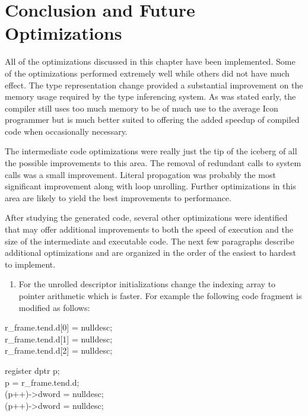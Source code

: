 \section{Conclusion and Future Optimizations}

All of the optimizations discussed in this chapter have been
implemented. Some of the optimizations performed extremely well while
others did not have much effect. The type representation change
provided a substantial improvement on the memory usage required by the
type inferencing system. As was stated early, the compiler still uses
too much memory to be of much use to the average Icon programmer but
is much better suited to offering the added speedup of compiled code
when occasionally necessary.

The intermediate code optimizations were really just the tip of the
iceberg of all the possible improvements to this area. The removal of
redundant calls to system calls was a small improvement. Literal
propagation was probably the most significant improvement along with
loop unrolling. Further optimizations in this area are likely to yield
the best improvements to performance.

After studying the generated code, several other optimizations were
identified that may offer additional improvements to both the speed of
execution and the size of the intermediate and executable code. The
next few paragraphs describe additional optimizations and are
organized in the order of the easiest to hardest to implement.

\liststyleLxxxvi
\begin{enumerate}
\item 
For the unrolled descriptor initializations change the indexing array to pointer arithmetic which is faster. For example
the following code fragment is modified as follows: 
\end{enumerate}
\goodbreak
\begin{iconcode}
r\_frame.tend.d[0] = nulldesc;\\
r\_frame.tend.d[1] = nulldesc;\\
r\_frame.tend.d[2] = nulldesc;\\
\end{iconcode}
\goodbreak
\makebox[0.5\textwidth]{\hrulefill}
\begin{iconcode}
register dptr p;\\
p = r\_frame.tend.d;\\
(p++)->dword = nulldesc;\\
(p++)->dword = nulldesc;\\
\end{iconcode}

